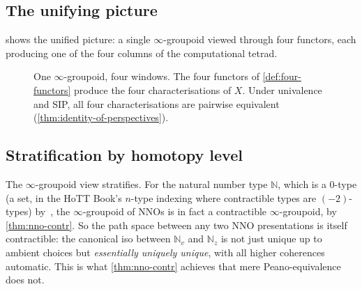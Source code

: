 \documentclass[12pt]{article}
\theoremstyle{definition}
\theoremstyle{remark}
\newcommand{\N}{\mathbb{N}}
\newcommand{\U}{\mathcal{U}}
\newcommand{\eqv}{\simeq}
\begin{document}
\subsection{The unifying picture}

 shows the unified picture: a single $\infty$-groupoid
viewed through four functors, each producing one of the four columns of
the computational tetrad.

\begin{figure}[ht]
\centering
{}
\caption{One $\infty$-groupoid, four windows. The four functors of
\cref{def:four-functors} produce the four characterisations of $X$. Under
univalence and SIP, all four characterisations are pairwise equivalent
(\cref{thm:identity-of-perspectives}).}
\label{fig:four-views}
\end{figure}

\subsection{Stratification by homotopy level}

The $\infty$-groupoid view stratifies. For the natural number type $\N$,
which is a $0$-type (a set, in the HoTT Book's $n$-type indexing where
contractible types are $(-2)$-types) by~\cite[Theorem~7.1.6]{HoTTBook}, the
$\infty$-groupoid of NNOs is in fact a contractible $\infty$-groupoid, by
\cref{thm:nno-contr}. So the path space between any two NNO presentations
is itself contractible: the canonical iso between $\N_v$ and $\N_z$ is
not just unique up to ambient choices but \emph{essentially uniquely
unique}, with all higher coherences automatic. This is what
\cref{thm:nno-contr} achieves that mere Peano-equivalence does not.
\end{document}
